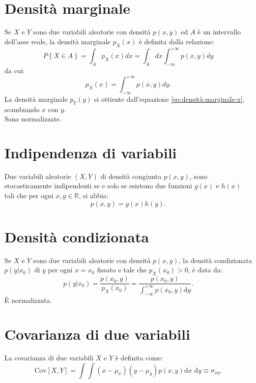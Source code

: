 \section{Densità marginale} %
\label{sec:densità-marginale}
Se $X$ e $Y$ sono due variabili aleatorie con densità $p(x,y)$ ed $A$ è un intervallo dell'asse reale, la densità marginale $p_{X}(x)$ è definita dalla relazione:
\begin{equation}
P\left\{ X\in A \right\} =\int _{ A }{ p_X(x)dx } =\int _{ A }{dx} \int _{ -\infty }^{ +\infty }{ p(x,y)dy } 
\end{equation}
da cui:
\begin{equation}
\label{eq:densità-marginale-x}
p_{ X }(x)=\int _{ -\infty  }^{ +\infty  }{ p(x,y)dy } .
\end{equation}
La densità marginale $p_{Y}(y)$ si ottiente dall'equazione \ref{eq:densità-marginale-x}, scambiando $x$ con $y$. \\ Sono normalizzate.

\section{Indipendenza di variabili} %
\label{sec:indipendenza-variabili}
Due variabili aleatorie $(X,Y)$ di densità congiunta $p(x,y)$, sono stocasticamente indipendenti se e solo se esistono due funzioni $g(x)$ e $h(x)$ tali che per ogni $x,y \in \mathbb{R}$, si abbia:
\begin{equation}
p\left( x,y \right) =g\left( x \right) h\left( y \right) .
\end{equation}

\section{Densità condizionata} %
\label{sec:densità-condizionata}
Se $X$ e $Y$ sono due variabili aleatorie con densità $p(x,y)$, la densità condizionata $p\left( y|{ x }_{ 0 } \right) $ di $y$ per ogni $x=x_0$ fissato e tale che $p_{ X }\left( x_{ 0 } \right) >0$, è data da:
\begin{equation}
p\left( y|{ x }_{ 0 } \right) =\frac { p\left( x_{ 0 },y \right)  }{ p_{ X }\left( x_{ 0 } \right)  } =\frac { p\left( x_{ 0 },y \right)  }{ \int _{ -\infty  }^{ +\infty  }{ p\left( x_{ 0 },y \right) \textrm{d}y }  } .
\end{equation}
\`E normalizzata.

\section{Covarianza di due variabili} %
\label{sec:covarianza-più-var}
La covarianza di due variabili $X$ e $Y$ è definita come:
\begin{equation}
\label{eq:covarianza}
\textrm{Cov} \left[ X,Y \right] =\int  \int { \left( x-\mu _{ x } \right) \left( y-\mu _{ y } \right) p\left( x,y \right) \textrm{d}x \textrm{ d}y } \equiv \sigma _{ xy }.
\end{equation}

